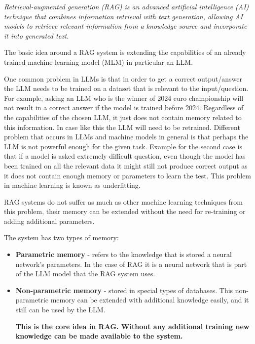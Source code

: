 \documentclass{wseas}
\begin{document}
\emph{Retrieval-augmented generation (RAG) is an advanced
 artificial intelligence (AI) technique that combines information 
 retrieval with text generation, allowing AI models to retrieve 
 relevant information from a knowledge source and incorporate it 
 into generated text}\cite{website_deffinition_rag}.


The basic idea around a RAG system is extending the capabilities of an
already trained machine learning model (MLM) in particular an LLM.

One common problem in LLMs is that in order to get a correct output/answer
the LLM needs to be trained on a dataset that is relevant to the
input/question. For example, asking an LLM who is the winner of 2024
euro championship will not result in a correct answer if the model is
trained before 2024. Regardless of the capabilities of the chosen LLM,
it just does not contain memory related to this information. In case
like this the LLM will need to be retrained. Different problem that
occurs in LLMs and machine models in general is that perhaps the LLM is
not powerful enough for the given task. Example for the second case is
that if a model is asked extremely difficult question, even though the
model has been trained on all the relevant data it might still not
produce correct output as it does not contain enough memory or parameters
to learn the test. This problem in machine learning is known as underfitting.

RAG systems do not suffer as much as other machine learning techniques 
from this problem, their memory can be extended without the need for 
re-training or adding additional parameters. 

The system has two types of memory:

\begin{itemize}

\item
  \textbf{Parametric memory} - refers to the knowledge that is stored a neural network's parameters.
  In the case of RAG it is a neural network that is part of the LLM model that the RAG system uses.
\item
  \textbf{Non-parametric memory} - stored in special types of databases.
  This non-parametric memory can be extended with additional knowledge
  easily, and it still can be used by the LLM.

  \textbf{This is the core
  idea in RAG. Without any additional training new knowledge can be made
  available to the system.}
\end{itemize}
\end{document}
